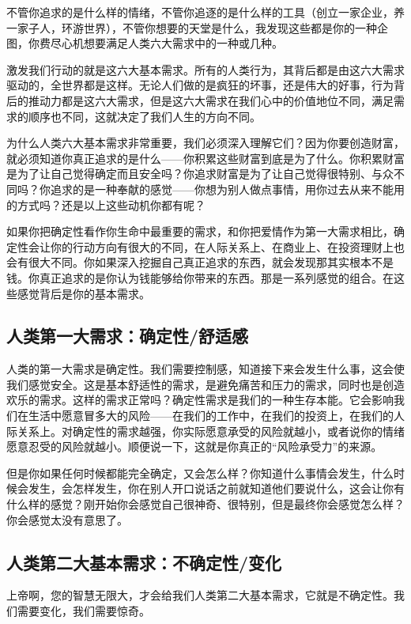 不管你追求的是什么样的情绪，不管你追逐的是什么样的工具（创立一家企业，养一家子人，环游世界），不管你想要的天堂是什么，我发现这些都是你的一种企图，你费尽心机想要满足人类六大需求中的一种或几种。

激发我们行动的就是这六大基本需求。所有的人类行为，其背后都是由这六大需求驱动的，全世界都是这样。无论人们做的是疯狂的坏事，还是伟大的好事，行为背后的推动力都是这六大需求，但是这六大需求在我们心中的价值地位不同，满足需求的顺序也不同，这就决定了我们人生的方向不同。

为什么人类六大基本需求非常重要，我们必须深入理解它们？因为你要创造财富，就必须知道你真正追求的是什么——你积累这些财富到底是为了什么。你积累财富是为了让自己觉得确定而且安全吗？你追求财富是为了让自己觉得很特别、与众不同吗？你追求的是一种奉献的感觉——你想为别人做点事情，用你过去从来不能用的方式吗？还是以上这些动机你都有呢？

如果你把确定性看作你生命中最重要的需求，和你把爱情作为第一大需求相比，确定性会让你的行动方向有很大的不同，在人际关系上、在商业上、在投资理财上也会有很大不同。你如果深入挖掘自己真正追求的东西，就会发现那其实根本不是钱。你真正追求的是你认为钱能够给你带来的东西。那是一系列感觉的组合。在这些感觉背后是你的基本需求。

\subsection{人类第一大需求：确定性/舒适感}

人类的第一大需求是确定性。我们需要控制感，知道接下来会发生什么事，这会使我们感觉安全。这是基本舒适性的需求，是避免痛苦和压力的需求，同时也是创造欢乐的需求。这样的需求正常吗？确定性需求是我们的一种生存本能。它会影响我们在生活中愿意冒多大的风险——在我们的工作中，在我们的投资上，在我们的人际关系上。对确定性的需求越强，你实际愿意承受的风险就越小，或者说你的情绪愿意忍受的风险就越小。顺便说一下，这就是你真正的“风险承受力”的来源。

但是你如果任何时候都能完全确定，又会怎么样？你知道什么事情会发生，什么时候会发生，会怎样发生，你在别人开口说话之前就知道他们要说什么，这会让你有什么样的感觉？刚开始你会感觉自己很神奇、很特别，但是最终你会感觉怎么样？你会感觉太没有意思了。

\subsection{人类第二大基本需求：不确定性/变化}

上帝啊，您的智慧无限大，才会给我们人类第二大基本需求，它就是不确定性。我们需要变化，我们需要惊奇。

